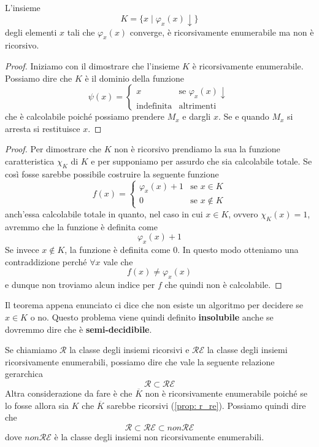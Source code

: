 \begin{theorem} \label{th: K_re_not_r}
	L'insieme
	\[ K = \{ x \mid \varphi_x(x) \downarrow \} \]
	degli elementi $x$ tali che $\varphi_x (x)$ converge, è
	ricorsivamente enumerabile ma non è ricorsivo.
	\begin{proof}
		Iniziamo con il dimostrare che l'insieme $K$ è
		ricorsivamente enumerabile. Possiamo dire che $K$ è il
		dominio della funzione
		\[
			\psi(x) = \begin{cases}
				x                 & \text{se } \varphi_x(x) \downarrow \\
				\text{indefinita} & \text{altrimenti}
			\end{cases}
		\]
		che è calcolabile poiché possiamo prendere $M_x$ e
		dargli $x$. Se e quando $M_x$ si arresta si restituisce
		$x$.
	\end{proof}
	\begin{proof}
		Per dimostrare che $K$ non è ricorsivo prendiamo la sua
		la funzione caratteristica $\chi_K$ di $K$ e per
		supponiamo per assurdo che sia calcolabile totale. Se
		così fosse sarebbe possibile costruire la seguente
		funzione
		\[
			f(x) = \begin{cases}
				\varphi_x (x) + 1 & \text{se } x \in K    \\
				0                 & \text{se } x \notin K
			\end{cases}
		\]
		anch'essa calcolabile totale in quanto, nel caso in cui
		$x \in K$, ovvero $\chi_K(x) = 1$, avremmo che la
		funzione è definita come
		\[ \varphi_x (x) + 1 \]
		Se invece $x \notin K$, la funzione è definita come $0$.
		In questo modo otteniamo una contraddizione perché
		$\forall x$ vale che
		\[ f(x) \neq \varphi_x (x) \]
		e dunque non troviamo alcun indice per $f$ che quindi
		non è calcolabile.
	\end{proof}
\end{theorem}

Il teorema appena enunciato ci dice che non esiste un algoritmo
per decidere se $x \in K$ o no. Questo problema viene quindi
definito \textbf{insolubile} anche se dovremmo dire che è
\textbf{semi-decidibile}.

Se chiamiamo $\mathcal{R}$ la classe degli insiemi ricorsivi e
$\mathcal{RE}$ la classe degli insiemi ricorsivamente
enumerabili, possiamo dire che vale la seguente relazione
gerarchica
\[ \mathcal{R} \subset	\mathcal{RE} \]
Altra considerazione da fare è che $\overline{K}$ non è
ricorsivamente enumerabile poiché se lo fosse allora sia $K$
che $\overline{K}$ sarebbe ricorsivi (\ref{prop: r_re}).
Possiamo quindi dire che
\[ \mathcal{R} \subset \mathcal{RE} \subset non\mathcal{RE} \]
dove $non \mathcal{RE}$ è la classe degli insiemi non
ricorsivamente enumerabili.

